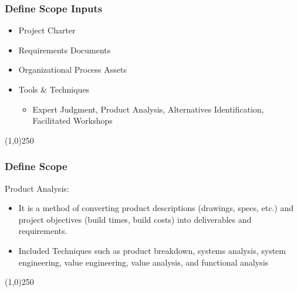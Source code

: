 \begin{frame}
\frametitle{Define Scope \hfill Inputs}
\begin{itemize}
	\item Project Charter
	\item Requirements Documents
	\item Organizational Process Assets
	\item Tools \& Techniques
	\begin{itemize}
		\item Expert Judgment, Product Analysis, Alternatives Identification, Facilitated Workshops
	\end{itemize}
\end{itemize}
\end{frame}\begin{center}\line(1,0){250}\end{center}



\begin{frame}
\frametitle{Define Scope}
Product Analysis:
\begin{itemize}
	\item  It is a method of converting product descriptions (drawings, specs, etc.) and project objectives (build times, build costs) into deliverables and requirements.
	\item Included Techniques such as product breakdown, systems analysis, system engineering, value engineering, value analysis, and functional analysis
\end{itemize}
\end{frame}\begin{center}\line(1,0){250}\end{center}



